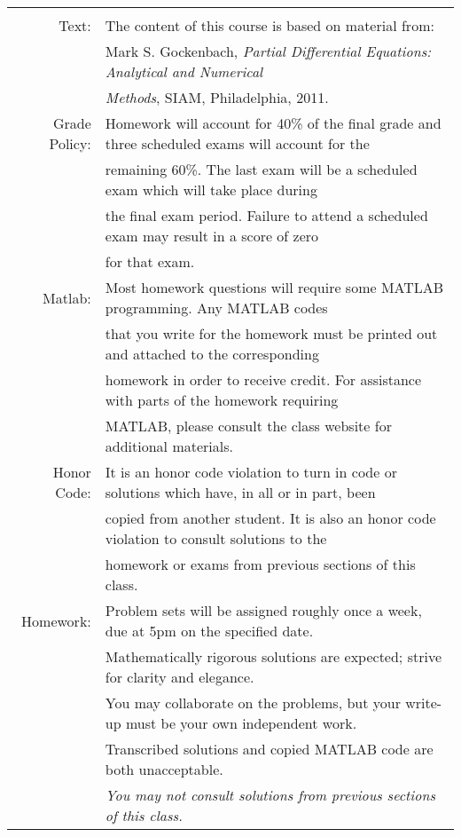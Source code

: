 \documentclass[10pt]{article}
\begin{document}
\hspace*{-3em}
\begin{tabular}{rl}
\hline & \\[-.5em]
%
%
Text: 			& The content of this course is based on material from:\\
				& Mark S. Gockenbach, \emph{Partial Differential Equations: Analytical and Numerical}\\
				& \emph{Methods}, SIAM, Philadelphia, 2011.\\[1.25em]
%
Grade Policy: 		& Homework will account for 40\% of the final grade and three scheduled exams will account for the \\
				& remaining 60\%.  The last exam will be a scheduled exam which will take place during\\
				& the final exam period. Failure to attend a scheduled exam may result in a score of zero\\
				& for that exam.\\[1.25em]
%
Matlab: 			& Most homework questions will require some MATLAB programming. Any MATLAB codes\\
				& that you write for the homework must be printed out and attached to the corresponding\\
				& homework in order to receive credit. For assistance with parts of the homework requiring \\
				& MATLAB, please consult the class website for additional materials.\\[1.25em] 
%
Honor Code:		& It is an honor code violation to turn in code or solutions which have, in all or in part, been\\
				& copied from another student. It is also an honor code violation to consult solutions to the\\
				& homework or exams from previous sections of this class.\\[1.25em]
%			
Homework: 		& Problem sets will be assigned roughly once a week, due at 5pm on the specified date.\\
				& Mathematically rigorous solutions are expected; strive for clarity and elegance.\\
				& You may collaborate on the problems, but your write-up must be your own independent work.\\
				& Transcribed solutions and copied MATLAB code are both unacceptable.  \\
				& \emph{You may not consult solutions from previous sections of this class.}\\[1.25em] 


\end{tabular}
\end{document}
